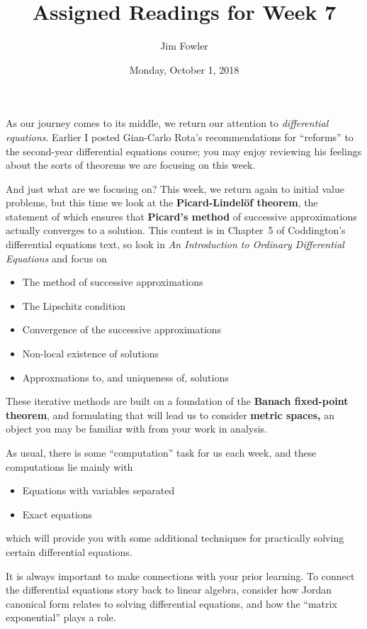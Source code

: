 \documentclass[11pt]{homework}
\author{Jim Fowler}
\title{Assigned Readings for Week 7}
\date{Monday, October 1, 2018}
\begin{document}
\maketitle

As our journey comes to its middle, we return our attention to
\textit{differential equations}.  Earlier I posted Gian-Carlo Rota's
recommendations for ``reforms'' to the second-year differential
equations course; you may enjoy reviewing his feelings about the sorts
of theorems we are focusing on this week.

And just what are we focusing on?  This week, we return again to
initial value problems, but this time we look at the
\textbf{Picard-Lindel\"of theorem}, the statement of which ensures
that \textbf{Picard's method} of successive approximations actually
converges to a solution.  This content is in Chapter~5 of Coddington's
differential equations text, so look in \textit{An Introduction to
  Ordinary Differential Equations} and focus on
\begin{itemize}
\item {} The method of successive approximations
\item {} The Lipschitz condition
\item {} Convergence of the successive approximations
\item {} Non-local existence of solutions
\item {} Approxmations to, and uniqueness of, solutions
\end{itemize}
These iterative methods are built on a foundation of the
\textbf{Banach fixed-point theorem}, and formulating that will lead us
to consider \textbf{metric spaces,} an object you may be familiar with
from your work in analysis.

As usual, there is some ``computation'' task for us each week, and these computations lie mainly with
\begin{itemize}
  \item {} Equations with variables separated
  \item {} Exact equations
\end{itemize}
which will provide you with some additional techniques for practically
solving certain differential equations.

It is always important to make connections with your prior learning.
To connect the differential equations story back to linear algebra,
consider how Jordan canonical form relates to solving differential
equations, and how the ``matrix exponential'' plays a role.
\end{document}
